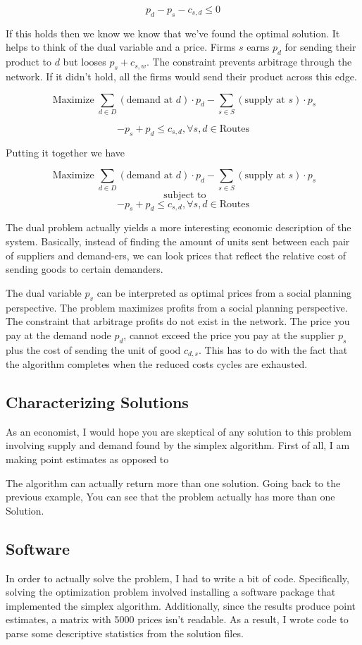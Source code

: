 \documentclass{report}
\begin{document}
$$ p_d -p_s - c_{s,d}\leq 0$$

If this holds then we know we know that we've found the optimal solution. It helps to think of the dual variable and a price. Firms $s$ earns $p_d$ for sending their product to $d$ but looses $p_s + c_{s,w}$. The constraint prevents arbitrage through the network. If it didn't hold, all the firms would send their product across this edge.

$$\operatorname{Maximize} \sum_{d \in D}  (\text{demand at } d) \cdot p_{d} -   \sum_{s \in S}  (\text{supply at } s) \cdot p_{s} $$

$$ -p_s + p_d \leq c_{s,d}, \forall s,d\in \textrm{Routes}$$

Putting it together we have

$$\operatorname{Maximize} \sum_{d \in D}  (\text{demand at } d) \cdot p_{d} -   \sum_{s \in S}  (\text{supply at } s) \cdot p_{s} $$
$$ \text{ subject to}$$
$$ -p_s + p_d \leq c_{s,d}, \forall s,d\in \textrm{Routes}$$

The dual problem actually yields a more interesting economic description of the system. Basically, instead of finding the amount of units sent between each pair of suppliers and demand-ers, we can look prices that reflect the relative cost of sending goods to certain demanders.

The dual variable $p_v$ can be interpreted as optimal prices from a social planning perspective. The problem maximizes profits from a social planning perspective. The constraint that arbitrage profits do not exist in the network. The price you pay at the demand node $p_d$, cannot exceed the price you pay at the supplier $p_s$ plus the cost of sending the unit of good $c_{d,s}$. This has to do with the fact that the algorithm completes when the reduced costs cycles are exhausted.

\subsection{Characterizing Solutions}

As an economist, I would hope you are skeptical of any solution to this problem involving supply and demand found by the simplex algorithm. First of all, I am making point estimates as opposed to 

The algorithm can actually return more than one solution. Going back to the previous example, You can see that the problem actually has more than one Solution.

\subsection{Software}
In order to actually solve the problem, I had to write a bit of code. Specifically, solving the optimization problem involved installing a software package that implemented the simplex algorithm. Additionally, since the results produce point estimates, a matrix with 5000 prices isn't readable. As a result, I wrote code to parse some descriptive statistics from the solution files.
\end{document}
